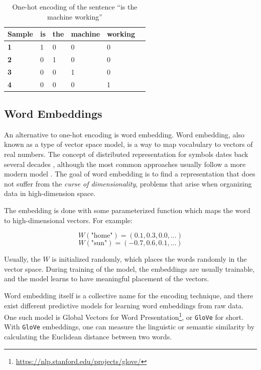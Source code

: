 \begin{table}[H]
    \centering
    \begin{tabular}{|l|l|l|l|l|l|}
        \hline
        \textbf{Sample} & \textbf{is} & \textbf{the} & \textbf{machine} & \textbf{working} \\ \hline
        \textbf{1}      & 1           & 0            & 0                & 0                \\ \hline
        \textbf{2}      & 0           & 1            & 0                & 0                \\ \hline
        \textbf{3}      & 0           & 0            & 1                & 0                \\ \hline
        \textbf{4}      & 0           & 0            & 0                & 1                \\ \hline
    \end{tabular}
    \caption{One-hot encoding of the sentence ``is the machine working''}
    \label{table:one_hot_encoding}
\end{table}

\subsection{Word Embeddings}
An alternative to one-hot encoding is word embedding. Word embedding, also known as a type of vector space model, is a way to map vocabulary to vectors of real numbers. The concept of distributed representation for symbols dates back several decades \citep{hinton1986learning}, although the most common approaches usually follow a more modern model \citep{bengio2003neural}. The goal of word embedding is to find a representation that does not suffer from the \emph{curse of dimensionality}, problems that arise when organizing data in high-dimension space. 

The embedding is done with some parameterized function which maps the word to high-dimensional vectors. For example:

\begin{equation*}
    W(\text{"home"}) = (0.1, 0.3, 0.0, \ldots)
\end{equation*}
\begin{equation*}
    W(\text{"sun"}) = (-0.7, 0.6, 0.1, \ldots)
\end{equation*}

Usually, the \(W\) is initialized randomly, which places the words randomly in the vector space. During training of the model, the embeddings are usually trainable, and the model learns to have meaningful placement of the vectors.

Word embedding itself is a collective name for the encoding technique, and there exist different predictive models for learning word embeddings from raw data. One such model is Global Vectors for Word Presentation\footnote{\url{https://nlp.stanford.edu/projects/glove/}}, or {\tt GloVe} for short. With {\tt GloVe} embeddings, one can measure the linguistic or semantic similarity by calculating the Euclidean distance between two words.
